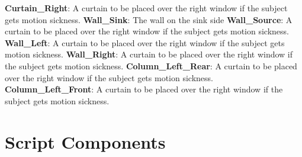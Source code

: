 \documentclass{article}
\begin{document}
\textbf{Curtain\_Right}: A curtain to be placed over the right window if the subject gets motion sickness. \newline \newline
\textbf{Wall\_Sink}: The wall on the sink side \newline \newline
\textbf{Wall\_Source}: A curtain to be placed over the right window if the subject gets motion sickness. \newline \newline
\textbf{Wall\_Left}: A curtain to be placed over the right window if the subject gets motion sickness. \newline \newline
\textbf{Wall\_Right}: A curtain to be placed over the right window if the subject gets motion sickness. \newline \newline
\textbf{Column\_Left\_Rear}: A curtain to be placed over the right window if the subject gets motion sickness. \newline \newline
\textbf{Column\_Left\_Front}: A curtain to be placed over the right window if the subject gets motion sickness. \newline \newline

\section*{Script Components}
\end{document}
